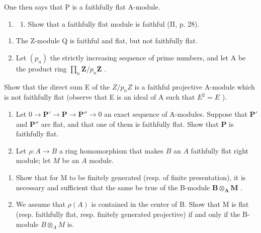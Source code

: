 One then says that P is a faithfully flat A-module.

\begin{enumerate}
\def\labelenumi{\arabic{enumi})}
\setcounter{enumi}{9}
\tightlist
\item
  \begin{enumerate}
  \def\labelenumii{\alph{enumii})}
  \tightlist
  \item
    Show that a faithfully flat module is faithful (II, p. 28).
  \end{enumerate}
\end{enumerate}

\begin{enumerate}
\def\labelenumi{\alph{enumi})}
\setcounter{enumi}{1}
\item
  The Z-module Q is faithful and flat, but not faithfully flat.
\item
  Let \((p_n)\) the strictly increasing sequence of prime numbers, and let A be the product ring \(\prod_{n} \mathbf{Z}/p_n \mathbf{Z}\) .
\end{enumerate}

Show that the direct sum E of the \(Z/p_{n}Z\) is a faithful projective A-module which is not faithfully flat (observe that E is an ideal of A such that \(E^{2}=E\) ).

\begin{enumerate}
\def\labelenumi{\arabic{enumi})}
\setcounter{enumi}{10}
\item
  Let \(0 \to \mathbf{P}' \to \mathbf{P} \to \mathbf{P}'' \to 0\) an exact sequence of A-modules. Suppose that \(\mathbf{P}'\) and \(\mathbf{P}''\) are flat, and that one of them is faithfully flat. Show that \(\mathbf{P}\) is faithfully flat.
\item
  Let \(\rho: A \to B\) a ring homomorphism that makes \(B\) an \(A\) faithfully flat right module; let \(M\) be an \(A\) module.
\end{enumerate}

\begin{enumerate}
\def\labelenumi{\alph{enumi})}
\item
  Show that for M to be finitely generated (resp. of finite presentation), it is necessary and sufficient that the same be true of the B-module \(\mathbf{B} \otimes_{\mathbf{A}} \mathbf{M}\) .
\item
  We assume that \(\rho(A)\) is contained in the center of B. Show that M is flat (resp. faithfully flat, resp. finitely generated projective) if and only if the B-module \(B \otimes_{A} M\) is.
\end{enumerate}


